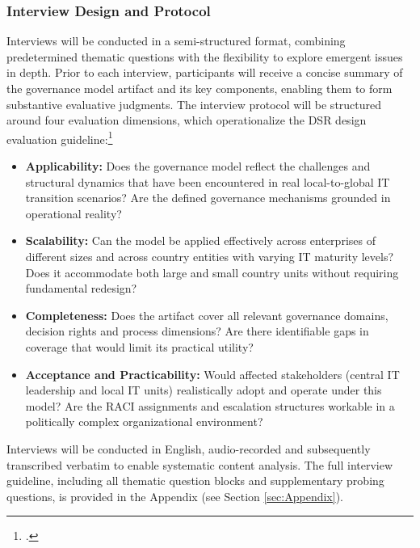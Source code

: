 \subsubsection{Interview Design and Protocol}
\label{subsubsec:InterviewDesignAndProtocol}
Interviews will be conducted in a semi-structured format, combining predetermined thematic questions with the flexibility to explore emergent issues in depth.
Prior to each interview, participants will receive a concise summary of the governance model artifact and its key components, enabling them to form substantive evaluative judgments.
The interview protocol will be structured around four evaluation dimensions, which operationalize the \ac{DSR} design evaluation guideline:\footcite[86]{hevnerDesignScienceInformation2004}
\begin{itemize}
    \item \textbf{Applicability:} Does the governance model reflect the challenges and structural dynamics that have been encountered in real local-to-global IT transition scenarios? Are the defined governance mechanisms grounded in operational reality?
    \item \textbf{Scalability:} Can the model be applied effectively across enterprises of different sizes and across country entities with varying IT maturity levels? Does it accommodate both large and small country units without requiring fundamental redesign?
    \item \textbf{Completeness:} Does the artifact cover all relevant governance domains, decision rights and process dimensions? Are there identifiable gaps in coverage that would limit its practical utility?
    \item \textbf{Acceptance and Practicability:} Would affected stakeholders (central IT leadership and local IT units) realistically adopt and operate under this model? Are the \ac{RACI} assignments and escalation structures workable in a politically complex organizational environment?
\end{itemize}
Interviews will be conducted in English, audio-recorded and subsequently transcribed verbatim to enable systematic content analysis.
The full interview guideline, including all thematic question blocks and supplementary probing questions, is provided in the Appendix (see Section \ref{sec:Appendix}).

